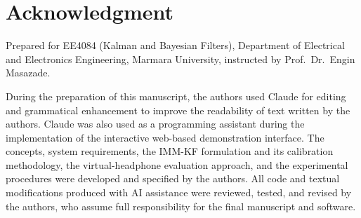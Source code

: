 \documentclass[conference]{IEEEtran}
\begin{document}
\section*{Acknowledgment}
Prepared for EE4084 (Kalman and Bayesian Filters), Department of Electrical and
Electronics Engineering, Marmara University, instructed by Prof.\ Dr.\ Engin
Masazade.

During the preparation of this manuscript, the authors used Claude for editing
and grammatical enhancement to improve the readability of text written by the
authors. Claude was also used as a programming assistant during the
implementation of the interactive web-based demonstration interface. The
concepts, system requirements, the IMM-KF formulation and its calibration
methodology, the virtual-headphone evaluation approach, and the experimental
procedures were developed and specified by the authors. All code and textual
modifications produced with AI assistance were reviewed, tested, and revised by
the authors, who assume full responsibility for the final manuscript and
software.



\end{document}
